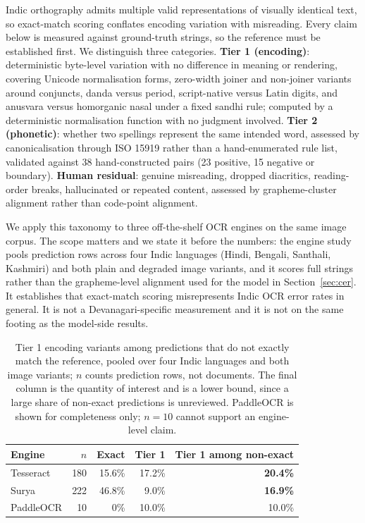 \documentclass{article}
\begin{document}
Indic orthography admits multiple valid representations of visually identical text, so
exact-match scoring conflates encoding variation with misreading. Every claim below is
measured against ground-truth strings, so the reference must be established first. We
distinguish three categories. \textbf{Tier 1 (encoding)}: deterministic byte-level variation
with no difference in meaning or rendering, covering Unicode normalisation forms, zero-width
joiner and non-joiner variants around conjuncts, danda versus period, script-native versus
Latin digits, and anusvara versus homorganic nasal under a fixed sandhi rule; computed by a
deterministic normalisation function with no judgment involved. \textbf{Tier 2 (phonetic)}:
whether two spellings represent the same intended word, assessed by canonicalisation through
ISO 15919 rather than a hand-enumerated rule list, validated against 38 hand-constructed pairs
(23 positive, 15 negative or boundary). \textbf{Human residual}: genuine misreading, dropped
diacritics, reading-order breaks, hallucinated or repeated content, assessed by
grapheme-cluster alignment rather than code-point alignment.

We apply this taxonomy to three off-the-shelf OCR engines on the same image corpus. The scope
matters and we state it before the numbers: the engine study pools prediction rows across four
Indic languages (Hindi, Bengali, Santhali, Kashmiri) and both plain and degraded image
variants, and it scores full strings rather than the grapheme-level alignment used for the
model in Section~\ref{sec:cer}. It establishes that exact-match scoring misrepresents Indic OCR
error rates in general. It is not a Devanagari-specific measurement and it is not on the same
footing as the model-side results.

\begin{table}[h]
\small
\centering
\caption{Tier 1 encoding variants among predictions that do not exactly match the reference,
pooled over four Indic languages and both image variants; $n$ counts prediction rows, not
documents. The final column is the quantity of interest and is a lower bound, since a large
share of non-exact predictions is unreviewed. PaddleOCR is shown for completeness only;
$n=10$ cannot support an engine-level claim.}
\label{tab:tier1}
\begin{tabular}{lrrrr}
\toprule
Engine & $n$ & Exact & Tier 1 & Tier 1 among non-exact \\
\midrule
Tesseract  & 180 & 15.6\% & 17.2\% & \textbf{20.4\%} \\
Surya      & 222 & 46.8\% & 9.0\%  & \textbf{16.9\%} \\
PaddleOCR  & 10  & 0\%    & 10.0\% & 10.0\% \\
\bottomrule
\end{tabular}
\end{table}
\end{document}
